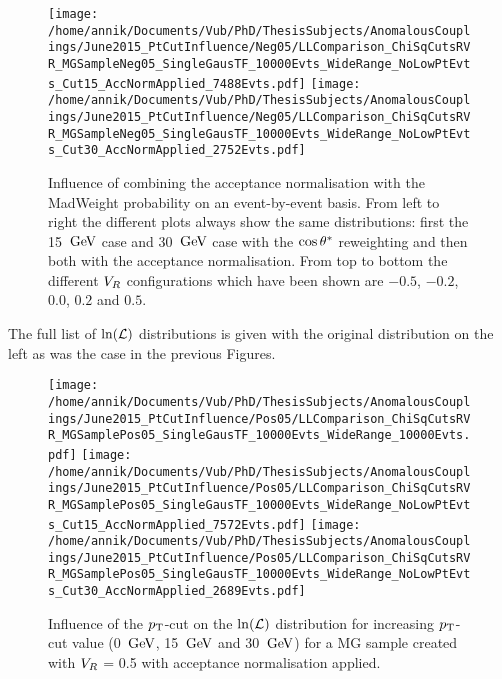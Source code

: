 \begin{figure}[h!t]
 \texttt{[image: /home/annik/Documents/Vub/PhD/ThesisSubjects/AnomalousCouplings/June2015\_PtCutInfluence/Neg05/LLComparison\_ChiSqCutsRVR\_MGSampleNeg05\_SingleGausTF\_10000Evts\_WideRange\_NoLowPtEvts\_Cut15\_AccNormApplied\_7488Evts.pdf]}
 \texttt{[image: /home/annik/Documents/Vub/PhD/ThesisSubjects/AnomalousCouplings/June2015\_PtCutInfluence/Neg05/LLComparison\_ChiSqCutsRVR\_MGSampleNeg05\_SingleGausTF\_10000Evts\_WideRange\_NoLowPtEvts\_Cut30\_AccNormApplied\_2752Evts.pdf]}
 \caption{Influence of combining the acceptance normalisation with the MadWeight probability on an event-by-event basis. From left to right the different plots always show the same distributions: first the 15 $\, \mathrm{GeV}$ case and 30 $\, \mathrm{GeV}$ case with the $\cos \theta^{*}$ reweighting and then both with the acceptance normalisation. From top to bottom the different $V_{R}$ configurations which have been shown are $-0.5$, $-0.2$, $0.0$, $0.2$ and $0.5$.}
 \label{fig::AccNorm}
 \end{figure}

The full list of $\ln(\mathcal{L})$ distributions is given with the original distribution on the left as was the case in the previous Figures.

\begin{figure}[h!t]
 \centering
 \texttt{[image: /home/annik/Documents/Vub/PhD/ThesisSubjects/AnomalousCouplings/June2015\_PtCutInfluence/Pos05/LLComparison\_ChiSqCutsRVR\_MGSamplePos05\_SingleGausTF\_10000Evts\_WideRange\_10000Evts.pdf]}
 \texttt{[image: /home/annik/Documents/Vub/PhD/ThesisSubjects/AnomalousCouplings/June2015\_PtCutInfluence/Pos05/LLComparison\_ChiSqCutsRVR\_MGSamplePos05\_SingleGausTF\_10000Evts\_WideRange\_NoLowPtEvts\_Cut15\_AccNormApplied\_7572Evts.pdf]}
 \texttt{[image: /home/annik/Documents/Vub/PhD/ThesisSubjects/AnomalousCouplings/June2015\_PtCutInfluence/Pos05/LLComparison\_ChiSqCutsRVR\_MGSamplePos05\_SingleGausTF\_10000Evts\_WideRange\_NoLowPtEvts\_Cut30\_AccNormApplied\_2689Evts.pdf]}
 \caption{Influence of the $p_{\textrm T}$-cut on the $\ln(\mathcal{L})$ distribution for increasing $p_{\textrm T}$-cut value (0 $\, \mathrm{GeV}$, 15 $\, \mathrm{GeV}$ and 30 $\, \mathrm{GeV}$) for a MG sample created with $V_{R}$ = 0.5 with acceptance normalisation applied.}
 \label{fig::AccNormPos05}
\end{figure}

